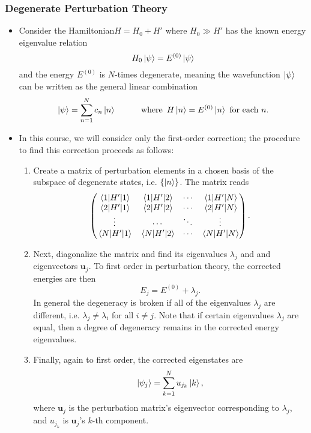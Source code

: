 \documentclass[11pt, a4paper]{article}
\newcommand{\Ham}{Hamiltonian\xspace}
\renewcommand{\vec}[1]{\bm{#1}} %
\newcommand{\p}{\psi}  %
\begin{document}
\subsubsection{Degenerate Perturbation Theory}
\begin{itemize}
	\item Consider the \Ham $ H = H_{0} + H' $ where $ H_{0} \gg H' $ has the known energy eigenvalue relation
	\begin{equation*}
		H_{0} \ket{\psi}  = E^{(0)} \ket{\psi}
	\end{equation*}
	and the energy $ E^{(0)} $ is $ N $-times degenerate, meaning the wavefunction $ \ket{\p} $ can be written as the general linear combination
	\begin{equation*}
		\ket{\psi} = \sum_{n=1}^{N}c_{n}\ket{n} \qquad \quad \text{where} \ \, H\ket{n} = E^{(0)} \ket{n} \ \text{for each } n.
	\end{equation*}
	\item In this course, we will consider only the first-order correction; the procedure to find this correction proceeds as follows:
	\begin{enumerate}
		\item Create a matrix of perturbation elements in a chosen basis of the subspace of degenerate states, i.e. $ \{\ket{n}\} $. The matrix reads
		\begin{equation*}
			\begin{pmatrix}
				\mel{1}{H'}{1} & \mel{1}{H'}{2} &  \cdots & \mel{1}{H'}{N} \\
				\mel{2}{H'}{1} & \mel{2}{H'}{2} &  \cdots & \mel{2}{H'}{N} \\
				\vdots & \cdots & \ddots & \vdots\\
				\mel{N}{H'}{1} & \mel{N}{H'}{2} &  \cdots & \mel{N}{H'}{N} 
			\end{pmatrix}.
		\end{equation*}
		
		\item Next, diagonalize the matrix and find its eigenvalues $ \lambda_{j} $ and and eigenvectors $ \vec{u}_{j} $. To first order in perturbation theory, the corrected energies are then
		\begin{equation*}
			E_{j} = E^{(0)} + \lambda_{j}.
		\end{equation*}
		In general the degeneracy is broken if all of the eigenvalues $ \lambda_{j} $ are different, i.e. $ \lambda_{j} \neq \lambda_{i} $ for all $ i \neq j $. Note that if certain eigenvalues $ \lambda_{j} $ are equal, then a degree of degeneracy remains in the corrected energy eigenvalues.
		
		\item Finally, again to first order, the corrected eigenstates are 
		\begin{equation*}
			\ket{\p_{j}} = \sum_{k=1}^{N}u_{j_{k}} \ket{k},
		\end{equation*}
		where $ \vec{u}_{j} $ is the perturbation matrix's eigenvector corresponding to $ \lambda_{j} $, and $ u_{j_{k}} $ is $ \vec{u}_{j} $'s $ k $-th component.
	\end{enumerate}
\end{itemize}
\end{document}
